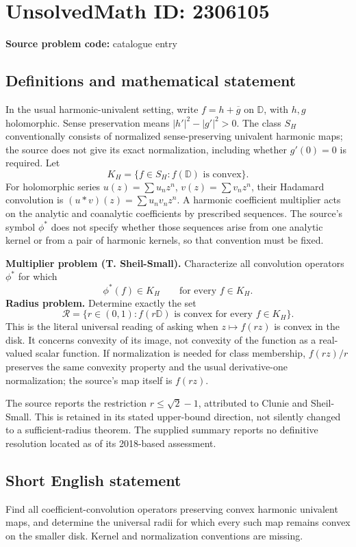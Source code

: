 \documentclass[11pt]{article}
\begin{document}
\section*{UnsolvedMath ID: 2306105}
\textbf{Source problem code:} catalogue entry
\subsection{Definitions and mathematical statement}
In the usual harmonic-univalent setting, write $f=h+\overline g$ on $\mathbb D$, with $h,g$ holomorphic. Sense preservation means $|h'|^2-|g'|^2>0$. The class $S_H$ conventionally consists of normalized sense-preserving univalent harmonic maps; the source does not give its exact normalization, including whether $g'(0)=0$ is required. Let
\[
K_H=\{f\in S_H:f(\mathbb D)\text{ is convex}\}.
\]
For holomorphic series $u(z)=\sum u_nz^n$, $v(z)=\sum v_nz^n$, their Hadamard convolution is $(u*v)(z)=\sum u_nv_nz^n$. A harmonic coefficient multiplier acts on the analytic and coanalytic coefficients by prescribed sequences. The source's symbol $\phi^*$ does not specify whether those sequences arise from one analytic kernel or from a pair of harmonic kernels, so that convention must be fixed.

\textbf{Multiplier problem (T. Sheil-Small).} Characterize all convolution operators $\phi^*$ for which
\[
\phi^*(f)\in K_H\qquad\text{for every }f\in K_H.
\]
\textbf{Radius problem.} Determine exactly the set
\[
\mathcal R=\{r\in(0,1):f(r\mathbb D)\text{ is convex for every }f\in K_H\}.
\]
This is the literal universal reading of asking when $z\mapsto f(rz)$ is convex in the disk. It concerns convexity of its image, not convexity of the function as a real-valued scalar function. If normalization is needed for class membership, $f(rz)/r$ preserves the same convexity property and the usual derivative-one normalization; the source's map itself is $f(rz)$.

The source reports the restriction $r\leq\sqrt2-1$, attributed to Clunie and Sheil-Small. This is retained in its stated upper-bound direction, not silently changed to a sufficient-radius theorem. The supplied summary reports no definitive resolution located as of its 2018-based assessment.
\subsection{Short English statement}
Find all coefficient-convolution operators preserving convex harmonic univalent maps, and determine the universal radii for which every such map remains convex on the smaller disk. Kernel and normalization conventions are missing.
\end{document}
